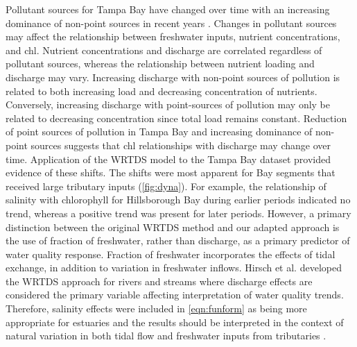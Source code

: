 \documentclass{svjour3}\usepackage[]{graphicx}\usepackage[]{color}
\begin{document}
Pollutant sources for Tampa Bay have changed over time with an increasing dominance of non-point sources in recent years \cite{Pribble01}.  Changes in pollutant sources may affect the relationship between freshwater inputs, nutrient concentrations, and \ac{chl}.  Nutrient concentrations and discharge are correlated regardless of pollutant sources, whereas the relationship between nutrient loading and discharge may vary.  Increasing discharge with non-point sources of pollution is related to both increasing load and decreasing concentration of nutrients.  Conversely, increasing discharge with point-sources of pollution may only be related to decreasing concentration since total load remains constant. Reduction of point sources of pollution in Tampa Bay and increasing dominance of non-point sources suggests that \ac{chl} relationships with discharge may change over time.  Application of the \ac{WRTDS} model to the Tampa Bay dataset provided evidence of these shifts.  The shifts were most apparent for Bay segments that received large tributary inputs (\cref{fig:dyna}). For example, the relationship of salinity with chlorophyll for Hillsborough Bay during earlier periods indicated no trend, whereas a positive trend was present for later periods.  However, a primary distinction between the original \ac{WRTDS} method and our adapted approach is the  use of fraction of freshwater, rather than discharge, as a primary predictor of water quality response.  Fraction of freshwater incorporates the effects of tidal exchange, in addition to variation in freshwater inflows.  Hirsch et al. \cite{Hirsch10} developed the \ac{WRTDS} approach for rivers and streams where discharge effects are considered the primary variable affecting interpretation of water quality trends.  Therefore, salinity effects were included in \cref{eqn:funform} as being more appropriate for estuaries and the results should be interpreted in the context of natural variation in both tidal flow and freshwater inputs from tributaries \cite{Cloern96}.
\end{document}

